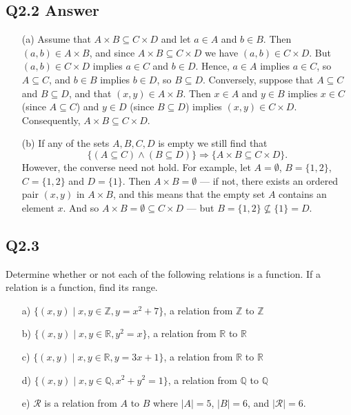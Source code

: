 \documentclass{article}
\begin{document}
\subsection*{Q2.2 Answer}
\begin{enumerate}
    \item[(a)] Assume that \( A \times B \subseteq C \times D \) and let \( a \in A \) and \( b \in B \). Then \( (a, b) \in A \times B \), and since \( A \times B \subseteq C \times D \) we have \( (a, b) \in C \times D \). But \( (a, b) \in C \times D \) implies \( a \in C \) and \( b \in D \). Hence, \( a \in A \) implies \( a \in C \), so \( A \subseteq C \), and \( b \in B \) implies \( b \in D \), so \( B \subseteq D \).
    Conversely, suppose that \( A \subseteq C \) and \( B \subseteq D \), and that \( (x, y) \in A \times B \). Then \( x \in A \) and \( y \in B \) implies \( x \in C \) (since \( A \subseteq C \)) and \( y \in D \) (since \( B \subseteq D \)) implies \( (x, y) \in C \times D \). Consequently, \( A \times B \subseteq C \times D \).
    \item[(b)] If any of the sets \( A, B, C, D \) is empty we still find that
    \[
    \{ (A \subseteq C) \land (B \subseteq D) \} \Rightarrow \{ A \times B \subseteq C \times D \}.
    \]
    However, the converse need not hold. For example, let \( A = \emptyset \), \( B = \{1, 2\} \), \( C = \{1, 2\} \) and \( D = \{1\} \). Then \( A \times B = \emptyset \) --- if not, there exists an ordered pair \( (x, y) \) in \( A \times B \), and this means that the empty set \( A \) contains an element \( x \). And so \( A \times B = \emptyset \subseteq C \times D \) --- but \( B = \{1, 2\} \not\subseteq \{1\} = D \).
\end{enumerate}
\newpage
{}
\subsection*{Q2.3}
 Determine whether or not each of the following relations is a function. If a relation is a function, find its range.

\begin{enumerate}
    \item[a)] \( \{ (x, y) \mid x, y \in \mathbb{Z}, y = x^2 + 7 \} \), a relation from \(\mathbb{Z}\) to \(\mathbb{Z}\)
    \item[b)] \( \{ (x, y) \mid x, y \in \mathbb{R}, y^2 = x \} \), a relation from \(\mathbb{R}\) to \(\mathbb{R}\)
    \item[c)] \( \{ (x, y) \mid x, y \in \mathbb{R}, y = 3x + 1 \} \), a relation from \(\mathbb{R}\) to \(\mathbb{R}\)
    \item[d)] \( \{ (x, y) \mid x, y \in \mathbb{Q}, x^2 + y^2 = 1 \} \), a relation from \(\mathbb{Q}\) to \(\mathbb{Q}\)
    \item[e)] \( \mathcal{R} \) is a relation from \( A \) to \( B \) where \( |A| = 5 \), \( |B| = 6 \), and \( |\mathcal{R}| = 6 \).
\end{enumerate}
\newpage
{}
\end{document}
